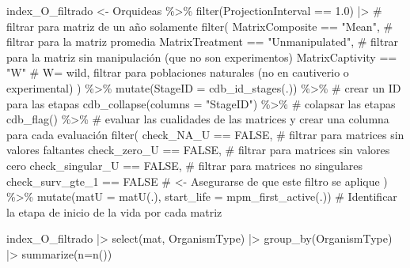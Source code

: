 \documentclass[
  12pt,
  letterpaper,
]{book}
\newenvironment{Shaded}{\begin{snugshade}}{\end{snugshade}}
\newcommand{\AttributeTok}[1]{\textcolor[rgb]{0.40,0.45,0.13}{#1}}
\newcommand{\CommentTok}[1]{\textcolor[rgb]{0.37,0.37,0.37}{#1}}
\newcommand{\ConstantTok}[1]{\textcolor[rgb]{0.56,0.35,0.01}{#1}}
\newcommand{\FloatTok}[1]{\textcolor[rgb]{0.68,0.00,0.00}{#1}}
\newcommand{\FunctionTok}[1]{\textcolor[rgb]{0.28,0.35,0.67}{#1}}
\newcommand{\NormalTok}[1]{\textcolor[rgb]{0.00,0.23,0.31}{#1}}
\newcommand{\OtherTok}[1]{\textcolor[rgb]{0.00,0.23,0.31}{#1}}
\newcommand{\SpecialCharTok}[1]{\textcolor[rgb]{0.37,0.37,0.37}{#1}}
\newcommand{\StringTok}[1]{\textcolor[rgb]{0.13,0.47,0.30}{#1}}
\begin{document}
\begin{Shaded}
\begin{Highlighting}[]
\NormalTok{index\_O\_filtrado }\OtherTok{\textless{}{-}}\NormalTok{ Orquideas }\SpecialCharTok{\%\textgreater{}\%}
  \FunctionTok{filter}\NormalTok{(ProjectionInterval }\SpecialCharTok{==} \FloatTok{1.0}\NormalTok{) }\SpecialCharTok{|\textgreater{}} \CommentTok{\# filtrar para matriz de un año solamente}
  \FunctionTok{filter}\NormalTok{(}
\NormalTok{    MatrixComposite }\SpecialCharTok{==} \StringTok{"Mean"}\NormalTok{, }\CommentTok{\# filtrar para la matriz promedia}
\NormalTok{    MatrixTreatment }\SpecialCharTok{==} \StringTok{"Unmanipulated"}\NormalTok{, }\CommentTok{\# filtrar para la matriz sin manipulación (que no son experimentos)}
\NormalTok{    MatrixCaptivity }\SpecialCharTok{==} \StringTok{"W"} \CommentTok{\# W= \textquotesingle{}wild\textquotesingle{}, filtrar para poblaciones naturales (no en cautiverio o experimental)}
\NormalTok{  ) }\SpecialCharTok{\%\textgreater{}\%}
  \FunctionTok{mutate}\NormalTok{(}\AttributeTok{StageID =} \FunctionTok{cdb\_id\_stages}\NormalTok{(.)) }\SpecialCharTok{\%\textgreater{}\%} \CommentTok{\# crear un ID para las etapas}
  \FunctionTok{cdb\_collapse}\NormalTok{(}\AttributeTok{columns =} \StringTok{"StageID"}\NormalTok{) }\SpecialCharTok{\%\textgreater{}\%} \CommentTok{\# colapsar las etapas}
  \FunctionTok{cdb\_flag}\NormalTok{() }\SpecialCharTok{\%\textgreater{}\%} \CommentTok{\# evaluar las cualidades de las matrices y crear una columna para cada evaluación}
  \FunctionTok{filter}\NormalTok{(}
\NormalTok{    check\_NA\_U }\SpecialCharTok{==} \ConstantTok{FALSE}\NormalTok{, }\CommentTok{\# filtrar para matrices sin valores faltantes}
\NormalTok{    check\_zero\_U }\SpecialCharTok{==} \ConstantTok{FALSE}\NormalTok{, }\CommentTok{\# filtrar para matrices sin valores cero}
\NormalTok{    check\_singular\_U }\SpecialCharTok{==} \ConstantTok{FALSE}\NormalTok{, }\CommentTok{\# filtrar para matrices no singulares}
\NormalTok{    check\_surv\_gte\_1 }\SpecialCharTok{==} \ConstantTok{FALSE} \CommentTok{\# \textless{}{-} Asegurarse de que este filtro se aplique}
\NormalTok{  ) }\SpecialCharTok{\%\textgreater{}\%}
  \FunctionTok{mutate}\NormalTok{(}\AttributeTok{matU =} \FunctionTok{matU}\NormalTok{(.), }\AttributeTok{start\_life =} \FunctionTok{mpm\_first\_active}\NormalTok{(.)) }\CommentTok{\# Identificar la etapa de inicio de la vida por cada matriz }

\NormalTok{index\_O\_filtrado }\SpecialCharTok{|\textgreater{}} \FunctionTok{select}\NormalTok{(mat, OrganismType) }\SpecialCharTok{|\textgreater{}} 
  \FunctionTok{group\_by}\NormalTok{(OrganismType) }\SpecialCharTok{|\textgreater{}} 
  \FunctionTok{summarize}\NormalTok{(}\AttributeTok{n=}\FunctionTok{n}\NormalTok{())}
\end{Highlighting}
\end{Shaded}
\end{document}
